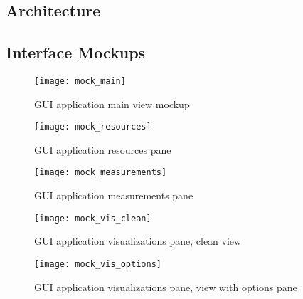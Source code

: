 \subsection{Architecture}

\subsection{Interface Mockups}

\begin{figure}[h]
  \centering
  \texttt{[image: mock\_main]}
  \caption{GUI application main view mockup}
  \label{fig:arch_overall}
\end{figure}


\begin{figure}[h]
  \centering
  \texttt{[image: mock\_resources]}
  \caption{GUI application resources pane}
  \label{fig:arch_overall}
\end{figure}

\begin{figure}[h]
  \centering
  \texttt{[image: mock\_measurements]}
  \caption{GUI application measurements pane}
  \label{fig:arch_overall}
\end{figure}

\begin{figure}[h]
  \centering
  \texttt{[image: mock\_vis\_clean]}
  \caption{GUI application visualizations pane, clean view}
  \label{fig:arch_overall}
\end{figure}

\begin{figure}[h]
  \centering
  \texttt{[image: mock\_vis\_options]}
  \caption{GUI application visualizations pane, view with options pane}
  \label{fig:arch_overall}
\end{figure}


